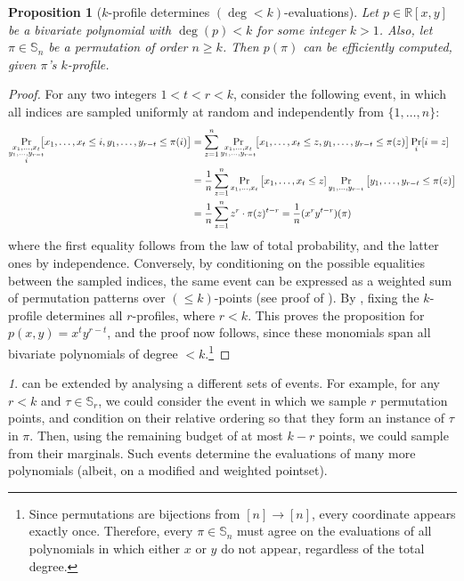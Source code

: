 \documentclass{article}
\newtheorem{proposition}[theorem]{Proposition}
\newcommand{\Sn}{\mathbb{S}_n}
\newcommand{\RR}{\mathbb{R}}
\theoremstyle{remark}
\newtheorem{rem}[theorem]{\protect\remarkname}
\providecommand{\remarkname}{Remark}
\theoremstyle{plain}
\begin{document}
\begin{proposition}[$k$-profile determines $(\deg < k)$-evaluations]
    \label{prop:k_prof_to_poly}
    Let $p \in \RR[x,y]$ be a bivariate polynomial with $\deg(p) < k$ for some integer $k > 1$. Also, let $\pi \in \Sn$ be a permutation of order $n\ge k$. Then $p(\pi)$ can be efficiently computed, given $\pi$'s $k$-profile. 
\end{proposition}
\begin{proof}
    For any two integers $1 < t < r < k$, consider the following event, in which all indices are sampled uniformly at random and independently from $\{1, \dots, n\}$:
    \begin{align*}
        \Pr_{\substack{x_1, \dots, x_t\\ y_1, \dots, y_{r-t} \\ i}} \hspace{-0.2cm}\big[ x_1, \dots, x_t \le i,y_1, \dots, y_{r-t} \le \pi(i) \big] &= \sum_{z=1}^n \Pr_{\substack{x_1, \dots, x_t \\ y_1, \dots, y_{r-t}}} \hspace{-0.1cm}\big[ x_1, \dots, x_t \le z, y_1, \dots, y_{r-t} \le \pi(z) \big] \Pr_{i} [i=z] \\
        &= \frac{1}{n} \sum_{z=1}^n \Pr_{x_1, \dots, x_t} \big[ x_1, \dots, x_t \le z] \Pr_{y_1, \dots, y_{r-t}} \big[ y_1, \dots, y_{r-t} \le \pi(z) \big] \\
        &= \frac{1}{n} \sum_{z=1}^n z^r \cdot \pi(z)^{t-r} = \frac{1}{n} (x^r y^{t-r})(\pi)
    \end{align*}
    where the first equality follows from the law of total probability, and the latter ones by independence. Conversely, by conditioning on the possible equalities between the sampled indices, the same event can be expressed as a weighted sum of permutation patterns over $(\le k)$-points (see proof of ). By , fixing the $k$-profile determines all $r$-profiles, where $r < k$. This proves the proposition for $p(x,y)=x^t y^{r-t}$, and the proof now follows, since these monomials span all bivariate polynomials of degree $<k$.\footnote{Since permutations are bijections from $[n] \to [n]$, every coordinate appears exactly once. Therefore, every $\pi \in \Sn$ must agree on the evaluations of all polynomials in which either $x$ or $y$ do not appear, regardless of the total degree.}   
\end{proof}

\begin{rem}
     can be extended by analysing a different sets of events. For example, for any $r < k$ and $\tau \in \mathbb{S}_r$, we could consider the event in which we sample $r$ permutation points, and condition on their relative ordering so that they form an instance of $\tau$ in $\pi$. Then, using the remaining budget of at most $k-r$ points, we could sample from their marginals. Such events determine the evaluations of many more polynomials (albeit, on a modified and weighted pointset).
\end{rem}
\end{document}
